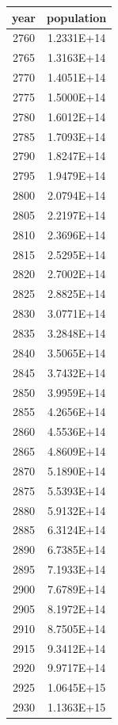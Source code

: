 \documentclass[a4paper]{article}
\begin{document}
	\begin{tabular}{|c|c|}
		\hline
		year & population \\
		\hline
		2760 & 1.2331E+14 \\
		\hline
		2765 & 1.3163E+14 \\
		\hline
		2770 & 1.4051E+14 \\
		\hline
		2775 & 1.5000E+14 \\
		\hline
		2780 & 1.6012E+14 \\
		\hline
		2785 & 1.7093E+14 \\
		\hline
		2790 & 1.8247E+14 \\
		\hline
		2795 & 1.9479E+14 \\
		\hline
		2800 & 2.0794E+14 \\
		\hline
		2805 & 2.2197E+14 \\
		\hline
		2810 & 2.3696E+14 \\
		\hline
		2815 & 2.5295E+14 \\
		\hline
		2820 & 2.7002E+14 \\
		\hline
		2825 & 2.8825E+14 \\
		\hline
		2830 & 3.0771E+14 \\
		\hline
		2835 & 3.2848E+14 \\
		\hline
		2840 & 3.5065E+14 \\
		\hline
		2845 & 3.7432E+14 \\
		\hline
		2850 & 3.9959E+14 \\
		\hline
		2855 & 4.2656E+14 \\
		\hline
		2860 & 4.5536E+14 \\
		\hline
		2865 & 4.8609E+14 \\
		\hline
		2870 & 5.1890E+14 \\
		\hline
		2875 & 5.5393E+14 \\
		\hline
		2880 & 5.9132E+14 \\
		\hline
		2885 & 6.3124E+14 \\
		\hline
		2890 & 6.7385E+14 \\
		\hline
		2895 & 7.1933E+14 \\
		\hline
		2900 & 7.6789E+14 \\
		\hline
		2905 & 8.1972E+14 \\
		\hline
		2910 & 8.7505E+14 \\
		\hline
		2915 & 9.3412E+14 \\
		\hline
		2920 & 9.9717E+14 \\
		\hline
		2925 & 1.0645E+15 \\
		\hline
		2930 & 1.1363E+15 \\

\end{tabular}
\end{document}
